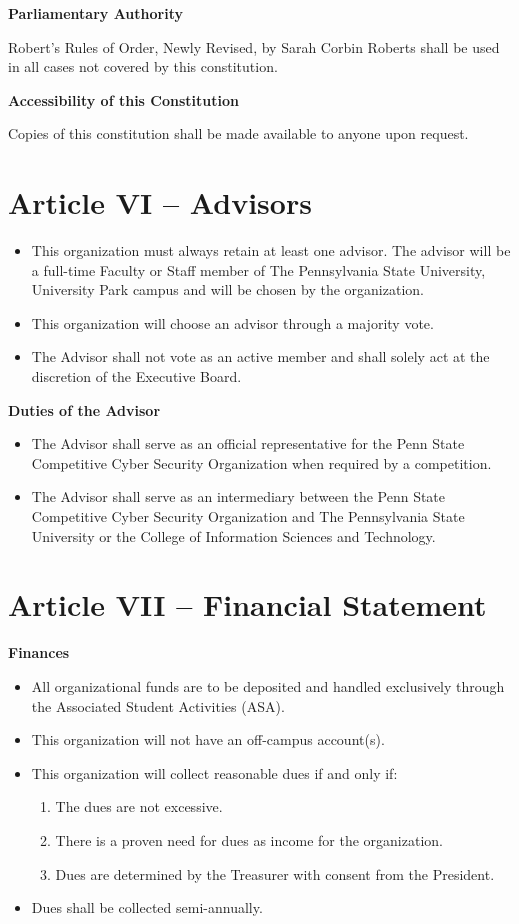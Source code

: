 \documentclass[12pt]{article}
\begin{document}
\textbf{Parliamentary Authority}

Robert's Rules of Order, Newly Revised, by Sarah Corbin Roberts shall be used in all cases not covered by this constitution.

\textbf{Accessibility of this Constitution}

Copies of this constitution shall be made available to anyone upon request.

\section*{Article VI -- Advisors}

\begin{itemize}
  \item This organization must always retain at least one advisor. The advisor will be a full-time Faculty or Staff member of The Pennsylvania State University, University Park campus and will be chosen by the organization.
  \item This organization will choose an advisor through a majority vote.
  \item The Advisor shall not vote as an active member and shall solely act at the discretion of the Executive Board.
\end{itemize}

\textbf{Duties of the Advisor}
\begin{itemize}
  \item The Advisor shall serve as an official representative for the Penn State Competitive Cyber Security Organization when required by a competition.
  \item The Advisor shall serve as an intermediary between the Penn State Competitive Cyber Security Organization and The Pennsylvania State University or the College of Information Sciences and Technology.
\end{itemize}

\section*{Article VII -- Financial Statement}

\textbf{Finances}
\begin{itemize}
  \item All organizational funds are to be deposited and handled exclusively through the Associated Student Activities (ASA).
  \item This organization will not have an off-campus account(s).
  \item This organization will collect reasonable dues if and only if:
  \begin{enumerate}
    \item The dues are not excessive.
    \item There is a proven need for dues as income for the organization.
    \item Dues are determined by the Treasurer with consent from the President.
  \end{enumerate}
  \item Dues shall be collected semi-annually.
\end{itemize}
\end{document}
